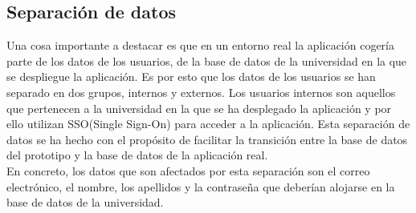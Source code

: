 \documentclass[11pt]{book}
\begin{document}
\subsection{Separación de datos}
Una cosa importante a destacar es que en un entorno real la aplicación cogería parte de los datos de los usuarios, de la base de datos de la universidad en la que se despliegue la aplicación. Es por esto que los datos de los usuarios se han separado en dos grupos, internos y externos. Los usuarios internos son aquellos que pertenecen a la universidad en la que se ha desplegado la aplicación y por ello utilizan SSO(Single Sign-On) para acceder a la aplicación. Esta separación de datos se ha hecho con el propósito de facilitar la transición entre la base de datos del prototipo y la base de datos de la aplicación real.\\
En concreto, los datos que son afectados por esta separación son el correo electrónico, el nombre, los apellidos y la contraseña que deberían alojarse en la base de datos de la universidad.
\end{document}
